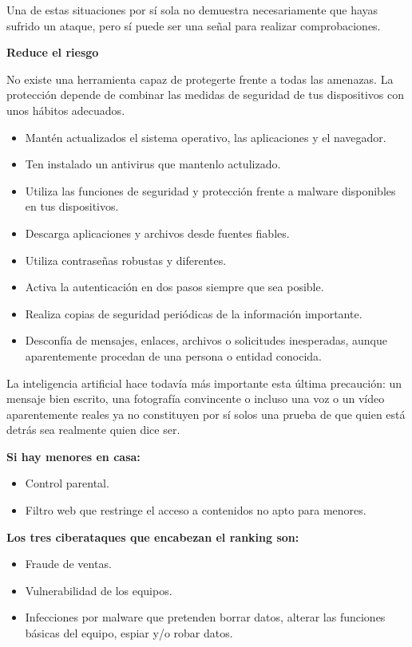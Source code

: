 \documentclass[
  spanish,
  a4paper,
  openany]{book}
\begin{document}
Una de estas situaciones por sí sola no demuestra necesariamente que hayas sufrido un ataque, pero sí puede ser una señal para realizar comprobaciones.

\textbf{Reduce el riesgo}

No existe una herramienta capaz de protegerte frente a todas las amenazas. La protección depende de combinar las medidas de seguridad de tus dispositivos con unos hábitos adecuados.

\begin{itemize}
\item
  Mantén actualizados el sistema operativo, las aplicaciones y el navegador.
\item
  Ten instalado un antivirus que mantenlo actulizado.
\item
  Utiliza las funciones de seguridad y protección frente a malware disponibles en tus dispositivos.
\item
  Descarga aplicaciones y archivos desde fuentes fiables.
\item
  Utiliza contraseñas robustas y diferentes.
\item
  Activa la autenticación en dos pasos siempre que sea posible.
\item
  Realiza copias de seguridad periódicas de la información importante.
\item
  Desconfía de mensajes, enlaces, archivos o solicitudes inesperadas, aunque aparentemente procedan de una persona o entidad conocida.
\end{itemize}

La inteligencia artificial hace todavía más importante esta última precaución: un mensaje bien escrito, una fotografía convincente o incluso una voz o un vídeo aparentemente reales ya no constituyen por sí solos una prueba de que quien está detrás sea realmente quien dice ser.

\textbf{Si hay menores en casa:}

\begin{itemize}
\item
  Control parental.
\item
  Filtro web que restringe el acceso a contenidos no apto para menores.
\end{itemize}

\textbf{Los tres ciberataques que encabezan el ranking son:}

\begin{itemize}
\item
  Fraude de ventas.
\item
  Vulnerabilidad de los equipos.
\item
  Infecciones por malware que pretenden borrar datos, alterar las funciones básicas del equipo, espiar y/o robar datos.
\end{itemize}
\end{document}
